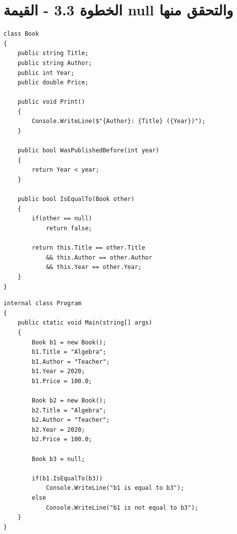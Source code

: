 \documentclass[11pt]{article}
\begin{document}
\section*{الخطوة 3.3 - القيمة \textenglish{null} والتحقق منها}
\begin{boxExample}
\begin{english}
\begin{verbatim}
class Book
{
    public string Title;
    public string Author;
    public int Year;
    public double Price;

    public void Print()
    {
        Console.WriteLine($"{Author}: {Title} ({Year})");
    }

    public bool WasPublishedBefore(int year)
    {
        return Year < year;
    }

    public bool IsEqualTo(Book other)
    {
        if(other == null)
            return false;

        return this.Title == other.Title
            && this.Author == other.Author
            && this.Year == other.Year;
    }
}
\end{verbatim}
\end{english}
\end{boxExample}
\begin{boxExample}
\begin{english}
\begin{verbatim}
internal class Program
{
    public static void Main(string[] args)
    {
        Book b1 = new Book();
        b1.Title = "Algebra";
        b1.Author = "Teacher";
        b1.Year = 2020;
        b1.Price = 100.0;

        Book b2 = new Book();
        b2.Title = "Algebra";
        b2.Author = "Teacher";
        b2.Year = 2020;
        b2.Price = 100.0;

        Book b3 = null;

        if(b1.IsEqualTo(b3))
            Console.WriteLine("b1 is equal to b3");
        else
            Console.WriteLine("b1 is not equal to b3");
    }
}
\end{verbatim}
\end{english}
\end{boxExample}

\clearpage
\end{document}
